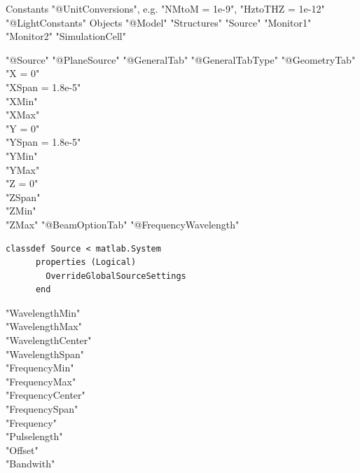 \documentclass[12pt]{article}
\numberwithin{equation}{section}
\numberwithin{equation}{section}
\begin{document}
\begin{outline}[enumerate]
   \1 Constants
   	\2 "@UnitConversions", e.g. "NMtoM = 1e-9", "HztoTHZ = 1e-12"
	\2 "@LightConstants"
   \1 Objects
      \2 "@Model" 
        \3 "Structures"
        \3 "Source"
        \3 "Monitor1"
        \3 "Monitor2"
        \3 "SimulationCell"     

      \2 "@Source"      
	\3 "@PlaneSource" %
         \4 "@GeneralTab" %
         \4 "@GeneralTabType" %
         \4 "@GeometryTab" \\%
          "X = 0" \\"XSpan = 1.8e-5" \\ "XMin" \\"XMax" \\ "Y = 0" \\"YSpan = 1.8e-5" \\ "YMin" \\"YMax" \\ "Z = 0" \\"ZSpan" \\ "ZMin" \\"ZMax"
         \4 "@BeamOptionTab" %
         \4 "@FrequencyWavelength" \\%
         \begin{lstlisting}[style=Matlab-editor]
	classdef Source < matlab.System
	  properties (Logical) 
	    OverrideGlobalSourceSettings
	  end        
         \end{lstlisting}
          "WavelengthMin" \\ "WavelengthMax" \\ "WavelengthCenter" \\"WavelengthSpan" \\ "FrequencyMin" \\ "FrequencyMax" \\"FrequencyCenter" \\"FrequencySpan" \\ "Frequency" \\ "Pulselength" \\ "Offset" \\"Bandwith"
   

\end{outline}
\end{document}
